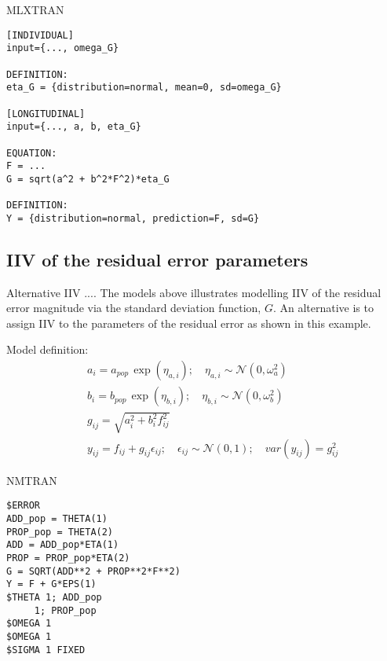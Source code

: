 \begin{lrbox}{\lstbox}\begin{minipage}{16cm}
MLXTRAN
\begin{lstlisting}[frame=single,language=MLX]
[INDIVIDUAL]
input={..., omega_G}

DEFINITION:
eta_G = {distribution=normal, mean=0, sd=omega_G}

[LONGITUDINAL]
input={..., a, b, eta_G}

EQUATION:
F = ...
G = sqrt(a^2 + b^2*F^2)*eta_G

DEFINITION:
Y = {distribution=normal, prediction=F, sd=G}
\end{lstlisting}   
\end{minipage}\end{lrbox}
\usebox\lstbox


\subsection{IIV of the residual error parameters}
Alternative IIV ....
\label{subsec:altIIV}
The models above illustrates modelling IIV of the residual error magnitude via the 
standard deviation function, $G$. An alternative is to assign IIV to the parameters 
of the residual error as shown in this example.

\bigskip
Model definition:
\begin{eqnarray}
&& a_i = a_{pop}\, \exp(\eta_{a,i}); \quad \eta_{a,i} \sim \mathcal{N}(0,\omega_a^2) \nonumber \\
&& b_i = b_{pop}\, \exp(\eta_{b,i}); \quad \eta_{b,i} \sim \mathcal{N}(0,\omega_b^2) \nonumber \\
&& g_{ij} = \sqrt{a_i^2 + b_i^2 f_{ij}^2} \nonumber \\
&& y_{ij} = f_{ij} + g_{ij} \epsilon_{ij}; \quad \epsilon_{ij} \sim \mathcal{N}(0,1); \quad var(y_{ij}) = g^2_{ij}	\nonumber
\end{eqnarray}

\bigskip
\begin{lrbox}{\lstbox}\begin{minipage}{16cm}
NMTRAN
\begin{lstlisting}[frame=single,language=NM]
$ERROR
ADD_pop = THETA(1)
PROP_pop = THETA(2)
ADD = ADD_pop*ETA(1)
PROP = PROP_pop*ETA(2)
G = SQRT(ADD**2 + PROP**2*F**2)
Y = F + G*EPS(1)
$THETA 1; ADD_pop
	 1; PROP_pop
$OMEGA 1
$OMEGA 1
$SIGMA 1 FIXED
\end{lstlisting}   
\end{minipage}\end{lrbox}
\usebox\lstbox


